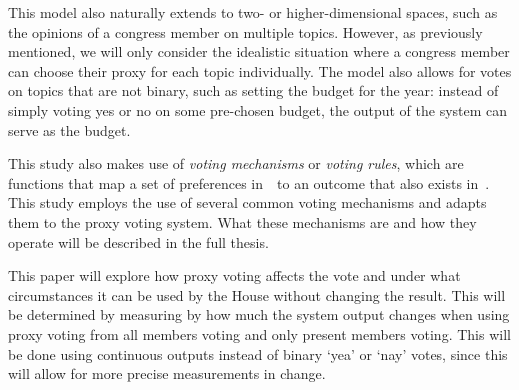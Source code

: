 This model also naturally extends to two- or higher-dimensional spaces, such as
the opinions of a congress member on multiple topics.
However, as previously mentioned, we will only consider the idealistic
situation where a congress member can choose their proxy for each topic individually.
The model also allows for votes on topics that are not binary, such as setting the
budget for the year:
instead of simply voting yes or no on some pre-chosen budget, the output of the system
can serve as the budget.


This study also makes use of \textit{voting mechanisms} or \textit{voting rules},
which are functions that map a set of preferences in~\systemspace\ to an outcome that
also exists in~\systemspace.
%
%
This study employs the use of several common voting mechanisms and adapts them to the
proxy voting system.
What these mechanisms are and how they operate will be described in the full thesis.

This paper will explore how proxy voting affects the vote and under what
circumstances it can be used by the House without changing the result.
This will be determined by measuring by how much the system output changes when using
proxy voting from all members voting and only present members voting.
This will be done using continuous outputs instead of binary `yea' or `nay' votes,
since this will allow for more precise measurements in change.


